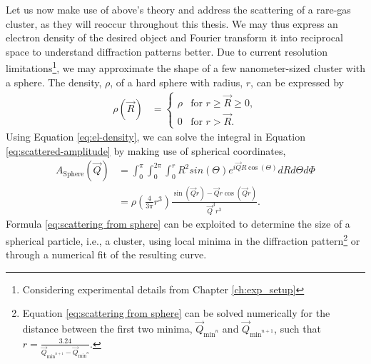 %
Let us now make use of above's theory and address the scattering of a rare-gas cluster, as they will reoccur throughout this thesis. We may thus express an electron density of the desired object and Fourier transform it into reciprocal space to understand diffraction patterns better. Due to current resolution limitations\footnote{Considering experimental details from Chapter \ref{ch:exp_setup}}, we may approximate the shape of a few nanometer-sized cluster with a sphere. The density, $\rho$, of a hard sphere with radius, $r$, can be expressed by 
\begin{align}
\rho\left(\vec{R}\right)&=\begin{cases}
\rho& \text{for $r \geq \vec{R} \geq 0$},\\
0&\text{for $r > \vec{R}$}.
\end{cases}
\label{eq:el-density}
\end{align}
Using Equation \eqref{eq:el-density}, we can solve the integral in Equation \eqref{eq:scattered-amplitude} by making use of spherical coordinates,
\begin{align}
A_{\text{Sphere}}\left(\vec{Q}\right) &= \int_{0}^{\pi}\int_{0}^{2\pi}\int_{0}^{r} R^{2}  sin\left(\Theta\right) e^{i \vec{Q} R \cos\left(\Theta\right)} dR d\Theta d\Phi\\
&=\rho\left(\frac{4}{3\pi}r^{3}\right)\frac{\sin\left(\vec{Q} r\right)-\vec{Q} r\cos\left(\vec{Q} r\right)}{\vec{Q}^{3} r^{3}}.
\label{eq:scattering from sphere}
\end{align}
Formula \eqref{eq:scattering from sphere} can be exploited to determine the size of a spherical particle, i.e., a cluster, using local minima in the diffraction pattern\footnote{Equation \eqref{eq:scattering from sphere} can be solved numerically for the distance between the first two minima, $\vec{Q}_{\text{min}^{n}}$ and $\vec{Q}_{\text{min}^{n+1}}$, such that $r=\frac{3.24}{\vec{Q}_{\text{min}^{n+1}}-\vec{Q}_{\text{min}^{n}}}$.} or through a numerical fit of the resulting curve.
%
%
%
%
%
%
